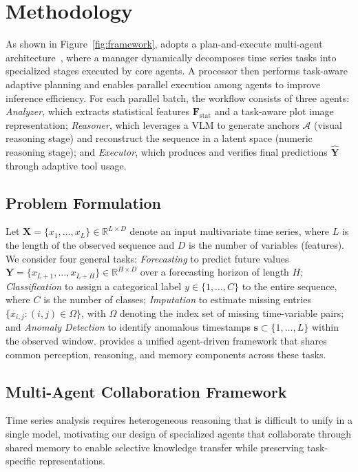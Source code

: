 \section{Methodology}
\label{sec:method}
As shown in Figure~\ref{fig:framework}, \model adopts a plan-and-execute multi-agent architecture~\cite{huang2024understanding}, where a manager dynamically decomposes time series tasks into specialized stages executed by core agents. 
A processor then performs task-aware adaptive planning and enables parallel execution among agents to improve inference efficiency. 
For each parallel batch, the workflow consists of three agents:  \emph{Analyzer}, which extracts statistical features $\mathbf{F}_{\text{stat}}$ and a task-aware plot image representation;  \emph{Reasoner}, which leverages a VLM to generate anchors $\mathcal{A}$ (visual reasoning stage) and reconstruct the sequence in a latent space (numeric reasoning stage); and  \emph{Executor}, which produces and verifies final predictions $\hat{\mathbf{Y}}$ through adaptive tool usage.

\subsection{Problem Formulation}
Let $\mathbf{X}=\{x_1,\dots,x_L\}\in\mathbb{R}^{L\times D}$ denote an input multivariate time series, where $L$ is the length of the observed sequence and $D$ is the number of variables (features). We consider four general tasks:
\emph{Forecasting} to predict future values $\mathbf{Y}=\{x_{L+1},\dots,x_{L+H}\}\in\mathbb{R}^{H\times D}$ over a forecasting horizon of length $H$;
\emph{Classification} to assign a categorical label $y\in\{1,\dots,C\}$ to the entire sequence, where $C$ is the number of classes;
\emph{Imputation} to estimate missing entries $\{\hat{x}_{i,j}:(i,j)\in\Omega\}$, with $\Omega$ denoting the index set of missing time-variable pairs; and
\emph{Anomaly Detection} to identify anomalous timestamps $\mathbf{s}\subset\{1,\dots,L\}$ within the observed window.
\model provides a unified agent-driven framework that shares common perception, reasoning, and memory components across these tasks.

\subsection{Multi-Agent Collaboration Framework}
\label{subsec:multi_agent}
Time series analysis requires heterogeneous reasoning that is difficult to unify in a single model, motivating our design of specialized agents that collaborate through shared memory to enable selective knowledge transfer while preserving task-specific representations.


